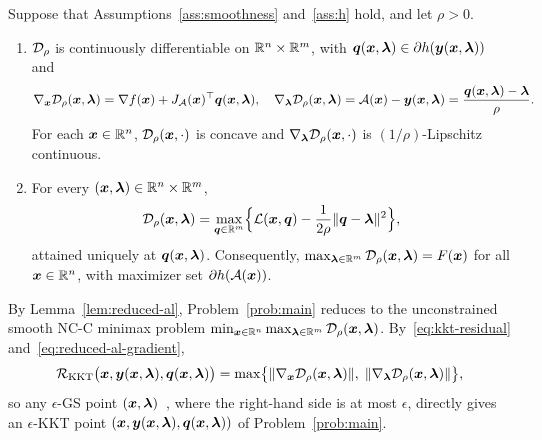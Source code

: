 \begin{lemma}
\label{lem:reduced-al}
Suppose that Assumptions~\ref{ass:smoothness} and~\ref{ass:h} hold, and let
\(\rho>0\).
\begin{enumerate}[label=(\alph*)] 
\item \(\mathcal{D}_\rho\) is continuously differentiable on \(\mathbb{R}^n\times\mathbb{R}^m\),
with \(\bm{q}(\bm{x},\bm{\lambda})\in\partial h(\bm{y}(\bm{x},\bm{\lambda}))\) and
\begin{equation}
    \nabla_{\bm{x}}\mathcal{D}_\rho(\bm{x},\bm{\lambda})
    =\nabla f(\bm{x})+J_{\mathcal{A}}(\bm{x})^\top\bm{q}(\bm{x},\bm{\lambda}),
    \quad
    \nabla_{\bm{\lambda}}\mathcal{D}_\rho(\bm{x},\bm{\lambda})
    =\mathcal{A}(\bm{x})-\bm{y}(\bm{x},\bm{\lambda})
    =\frac{\bm{q}(\bm{x},\bm{\lambda})-\bm{\lambda}}{\rho}.
    \label{eq:reduced-al-gradient}
\end{equation}
For each \(\bm{x}\in\mathbb{R}^n\), \(\mathcal{D}_\rho(\bm{x},\cdot)\) is concave and
\(\nabla_{\bm{\lambda}}\mathcal{D}_\rho(\bm{x},\cdot)\) is \((1/\rho)\)-Lipschitz
continuous.
\item For every \((\bm{x},\bm{\lambda})\in\mathbb{R}^n\times\mathbb{R}^m\),
\begin{equation}
    \mathcal{D}_\rho(\bm{x},\bm{\lambda})
    =\max_{\bm{q}\in\mathbb{R}^m}\Bigl\{\mathcal{L}(\bm{x},\bm{q})-\frac{1}{2\rho}\|\bm{q}-\bm{\lambda}\|^2\Bigr\},
    \label{eq:dual-smoothing}
\end{equation}
attained uniquely at \(\bm{q}(\bm{x},\bm{\lambda})\). Consequently,
\(\max_{\bm{\lambda}\in\mathbb{R}^m}\mathcal{D}_\rho(\bm{x},\bm{\lambda})=F(\bm{x})\) for all \(\bm{x}\in\mathbb{R}^n\),
with maximizer set \(\partial h(\mathcal{A}(\bm{x}))\).
\end{enumerate}
\end{lemma}

By Lemma~\ref{lem:reduced-al}, Problem~\eqref{prob:main} reduces to the
unconstrained smooth NC-C minimax problem \(\min_{\bm{x}\in\mathbb{R}^n}\max_{\bm{\lambda}\in\mathbb{R}^m}\mathcal{D}_\rho(\bm{x},\bm{\lambda})\).
By~\eqref{eq:kkt-residual} and~\eqref{eq:reduced-al-gradient},
\begin{equation}
    \mathcal R_{\mathrm{KKT}}\bigl(\bm{x},\bm{y}(\bm{x},\bm{\lambda}),\bm{q}(\bm{x},\bm{\lambda})\bigr)
    =\max\bigl\{
        \|\nabla_{\bm{x}}\mathcal{D}_\rho(\bm{x},\bm{\lambda})\|,\;
        \|\nabla_{\bm{\lambda}}\mathcal{D}_\rho(\bm{x},\bm{\lambda})\|
    \bigr\},
    \label{eq:kkt-gs-identity}
\end{equation}
so any \(\epsilon\)-GS point
\((\bm{x},\bm{\lambda})\)~\cite{pan2026optimal}, where the right-hand
side is at most \(\epsilon\), directly gives an \(\epsilon\)-KKT point
\((\bm{x},\bm{y}(\bm{x},\bm{\lambda}),\bm{q}(\bm{x},\bm{\lambda}))\) of Problem~\eqref{prob:main}. 

